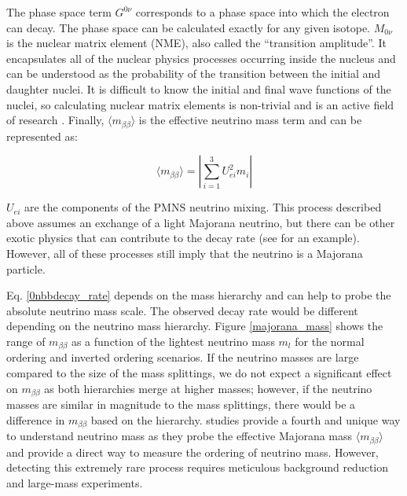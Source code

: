 The phase space term $G^{0\nu}$ corresponds to a phase space into which the electron can decay. The phase space can be calculated exactly for any given isotope. $M_{0\nu}$ is the nuclear matrix element (NME), also called the ``transition amplitude''. It encapsulates all of the nuclear physics processes occurring inside the nucleus and can be understood as the probability of the transition between the initial and daughter nuclei. It is difficult to know the initial and final wave functions of the nuclei, so calculating nuclear matrix elements is non-trivial and is an active field of research \cite{Menendez:2017fdf}. Finally, $\langle m_{\beta\beta}\rangle$ is the effective neutrino mass term and can be represented as:

\begin{equation}\label{effective_mjd_mass}
\langle m_{\beta\beta}\rangle =  \left|\sum_{i=1}^{3} U^2_{ei}m_i\right|
\end{equation}

$U_{ei}$ are the components of the PMNS neutrino mixing. This process described above assumes an exchange of a light Majorana neutrino, but there can be other exotic physics that can contribute to the decay rate (see \cite{Schechter_1982} for an example). However, all of these processes still imply that the neutrino is a Majorana particle.

Eq. \ref{0nbbdecay_rate} depends on the mass hierarchy and can help to probe the absolute neutrino mass scale. The observed decay rate would be different depending on the neutrino mass hierarchy. Figure \ref{majorana_mass} shows the range of $m_{\beta\beta}$ as a function of the lightest neutrino mass $m_l$ for the normal ordering and inverted ordering scenarios. If the neutrino masses are large compared to the size of the mass splittings, we do not expect a significant effect on $m_{\beta\beta}$ as both hierarchies merge at higher masses; however, if the neutrino masses are similar in magnitude to the mass splittings, there would be a difference in $m_{\beta\beta}$ based on the hierarchy. {\onbb} studies provide a fourth and unique way to understand neutrino mass as they probe the effective Majorana mass $\langle m_{\beta\beta}\rangle$ and provide a direct way to measure the ordering of neutrino mass. However, detecting this extremely rare process requires meticulous background reduction and large-mass experiments.


